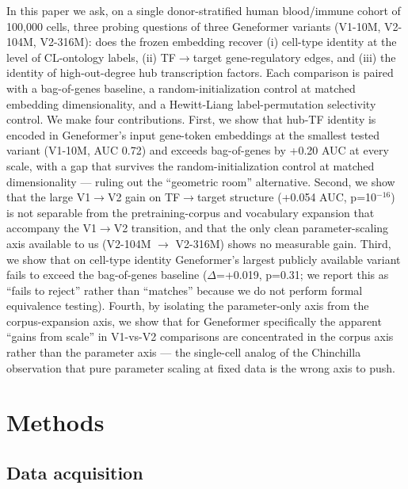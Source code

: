 \documentclass[
  11pt,
]{article}
\begin{document}
In this paper we ask, on a single donor-stratified human blood/immune
cohort of 100,000 cells, three probing questions of three Geneformer
variants (V1-10M, V2-104M, V2-316M): does the frozen embedding recover
(i) cell-type identity at the level of CL-ontology labels, (ii)
TF$\to$target gene-regulatory edges, and (iii) the identity of
high-out-degree hub transcription factors. Each comparison is paired
with a bag-of-genes baseline, a random-initialization control at matched
embedding dimensionality, and a Hewitt-Liang label-permutation
selectivity control. We make four contributions. First, we show that
hub-TF identity is encoded in Geneformer's input gene-token embeddings
at the smallest tested variant (V1-10M, AUC 0.72) and exceeds
bag-of-genes by +0.20 AUC at every scale, with a gap that survives the
random-initialization control at matched dimensionality --- ruling out
the ``geometric room'' alternative. Second, we show that the large V1$\to$V2
gain on TF$\to$target structure (+0.054 AUC, p=10$^{-16}$) is not separable from
the pretraining-corpus and vocabulary expansion that accompany the V1$\to$V2
transition, and that the only clean parameter-scaling axis available to
us (V2-104M $\to$ V2-316M) shows no measurable gain. Third, we show that on
cell-type identity Geneformer's largest publicly available variant fails
to exceed the bag-of-genes baseline ($\Delta$=+0.019, p=0.31; we report this as
``fails to reject'' rather than ``matches'' because we do not perform
formal equivalence testing). Fourth, by isolating the parameter-only
axis from the corpus-expansion axis, we show that for Geneformer
specifically the apparent ``gains from scale'' in V1-vs-V2 comparisons
are concentrated in the corpus axis rather than the parameter axis ---
the single-cell analog of the Chinchilla observation that pure parameter
scaling at fixed data is the wrong axis to push.

\section{Methods}\label{methods}

\subsection{Data acquisition}\label{data-acquisition}
\end{document}
